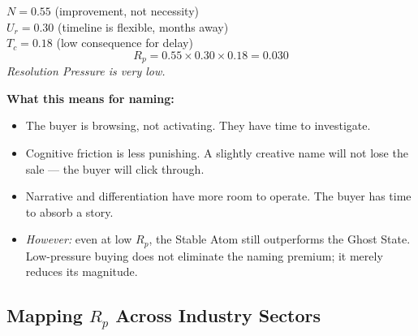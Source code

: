 \documentclass[12pt, openany]{book}
\theoremstyle{thmstyle}
\theoremstyle{defstyle}
\begin{document}
\begin{calcbox}
$N = 0.55$ (improvement, not necessity)\\
$U_r = 0.30$ (timeline is flexible, months away)\\
$T_c = 0.18$ (low consequence for delay)
\[
R_p = 0.55 \times 0.30 \times 0.18 = \mathbf{0.030}
\]
\textit{Resolution Pressure is very low.}

\textbf{What this means for naming:}
\begin{itemize}[leftmargin=1.5em]
  \item The buyer is browsing, not activating. They have time to investigate.
  \item Cognitive friction is less punishing. A slightly creative name will not lose the sale --- the buyer will click through.
  \item Narrative and differentiation have more room to operate. The buyer has time to absorb a story.
  \item \textit{However:} even at low $R_p$, the Stable Atom still outperforms the Ghost State. Low-pressure buying does not eliminate the naming premium; it merely reduces its magnitude.
\end{itemize}
\end{calcbox}

\subsection{Mapping $R_p$ Across Industry Sectors}
\end{document}
